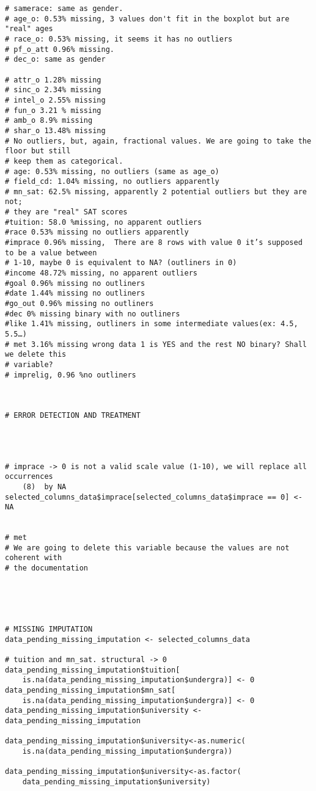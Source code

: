 \begin{verbatim}
# samerace: same as gender.
# age_o: 0.53% missing, 3 values don't fit in the boxplot but are "real" ages
# race_o: 0.53% missing, it seems it has no outliers
# pf_o_att 0.96% missing. 
# dec_o: same as gender

# attr_o 1.28% missing
# sinc_o 2.34% missing
# intel_o 2.55% missing
# fun_o 3.21 % missing
# amb_o 8.9% missing
# shar_o 13.48% missing
# No outliers, but, again, fractional values. We are going to take the floor but still
# keep them as categorical.
# age: 0.53% missing, no outliers (same as age_o)
# field_cd: 1.04% missing, no outliers apparently
# mn_sat: 62.5% missing, apparently 2 potential outliers but they are not; 
# they are "real" SAT scores
#tuition: 58.0 %missing, no apparent outliers
#race 0.53% missing no outliers apparently
#imprace 0.96% missing,  There are 8 rows with value 0 it’s supposed to be a value between
# 1-10, maybe 0 is equivalent to NA? (outliners in 0)
#income 48.72% missing, no apparent outliers
#goal 0.96% missing no outliners
#date 1.44% missing no outliners
#go_out 0.96% missing no outliners
#dec 0% missing binary with no outliners
#like 1.41% missing, outliners in some intermediate values(ex: 4.5, 5.5…)
# met 3.16% missing wrong data 1 is YES and the rest NO binary? Shall we delete this
# variable?
# imprelig, 0.96 %no outliners



# ERROR DETECTION AND TREATMENT




# imprace -> 0 is not a valid scale value (1-10), we will replace all occurrences 
    (8)  by NA
selected_columns_data$imprace[selected_columns_data$imprace == 0] <- NA


# met
# We are going to delete this variable because the values are not coherent with 
# the documentation





# MISSING IMPUTATION
data_pending_missing_imputation <- selected_columns_data

# tuition and mn_sat. structural -> 0
data_pending_missing_imputation$tuition[
    is.na(data_pending_missing_imputation$undergra)] <- 0
data_pending_missing_imputation$mn_sat[
    is.na(data_pending_missing_imputation$undergra)] <- 0
data_pending_missing_imputation$university <- data_pending_missing_imputation

data_pending_missing_imputation$university<-as.numeric(
    is.na(data_pending_missing_imputation$undergra))

data_pending_missing_imputation$university<-as.factor(
    data_pending_missing_imputation$university)


\end{verbatim}
